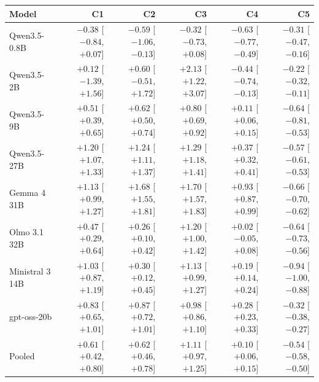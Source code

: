 \begin{tabular}{lrrrrr}
  \toprule
  Model & C1 & C2 & C3 & C4 & C5 \\
  \midrule
  Qwen3.5-0.8B & $-0.38$ [$-0.84$, $+0.07$] & $-0.59$ [$-1.06$, $-0.13$] & $-0.32$ [$-0.73$, $+0.08$] & $-0.63$ [$-0.77$, $-0.49$] & $-0.31$ [$-0.47$, $-0.16$] \\
  Qwen3.5-2B & $+0.12$ [$-1.39$, $+1.56$] & $+0.60$ [$-0.51$, $+1.72$] & $+2.13$ [$+1.22$, $+3.07$] & $-0.44$ [$-0.74$, $-0.13$] & $-0.22$ [$-0.32$, $-0.11$] \\
  Qwen3.5-9B & $+0.51$ [$+0.39$, $+0.65$] & $+0.62$ [$+0.50$, $+0.74$] & $+0.80$ [$+0.69$, $+0.92$] & $+0.11$ [$+0.06$, $+0.15$] & $-0.64$ [$-0.81$, $-0.53$] \\
  Qwen3.5-27B & $+1.20$ [$+1.07$, $+1.33$] & $+1.24$ [$+1.11$, $+1.37$] & $+1.29$ [$+1.18$, $+1.41$] & $+0.37$ [$+0.32$, $+0.41$] & $-0.57$ [$-0.61$, $-0.53$] \\
  Gemma 4 31B & $+1.13$ [$+0.99$, $+1.27$] & $+1.68$ [$+1.55$, $+1.81$] & $+1.70$ [$+1.57$, $+1.83$] & $+0.93$ [$+0.87$, $+0.99$] & $-0.66$ [$-0.70$, $-0.62$] \\
  Olmo 3.1 32B & $+0.47$ [$+0.29$, $+0.64$] & $+0.26$ [$+0.10$, $+0.42$] & $+1.20$ [$+1.00$, $+1.42$] & $+0.02$ [$-0.05$, $+0.08$] & $-0.64$ [$-0.73$, $-0.56$] \\
  Ministral 3 14B & $+1.03$ [$+0.87$, $+1.19$] & $+0.30$ [$+0.12$, $+0.45$] & $+1.13$ [$+0.99$, $+1.27$] & $+0.19$ [$+0.14$, $+0.24$] & $-0.94$ [$-1.00$, $-0.88$] \\
  gpt-oss-20b & $+0.83$ [$+0.65$, $+1.01$] & $+0.87$ [$+0.72$, $+1.01$] & $+0.98$ [$+0.86$, $+1.10$] & $+0.28$ [$+0.23$, $+0.33$] & $-0.32$ [$-0.38$, $-0.27$] \\
  \midrule
  Pooled & $+0.61$ [$+0.42$, $+0.80$] & $+0.62$ [$+0.46$, $+0.78$] & $+1.11$ [$+0.97$, $+1.25$] & $+0.10$ [$+0.06$, $+0.15$] & $-0.54$ [$-0.58$, $-0.50$] \\
  \bottomrule
\end{tabular}

